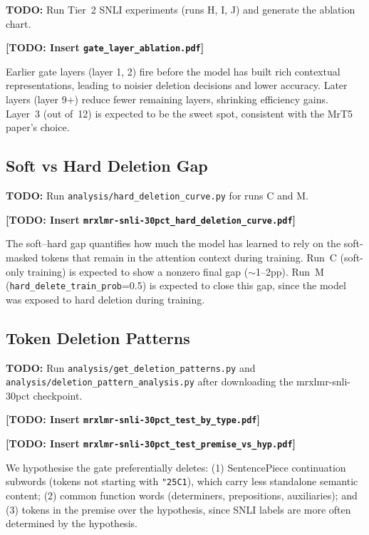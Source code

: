 \documentclass[11pt,a4paper]{article}
\newcommand{\todo}[1]{\begin{mdframed}[style=todostyle]\textcolor{todocolor}{\textbf{TODO:}} #1\end{mdframed}}
\begin{document}
\todo{Run Tier~2 SNLI experiments (runs H, I, J) and generate the ablation chart.}

\textbf{[TODO: Insert \texttt{gate\_layer\_ablation.pdf}]}

Earlier gate layers (layer 1, 2) fire before the model has built rich contextual representations, leading to noisier deletion decisions and lower accuracy. Later layers (layer 9+) reduce fewer remaining layers, shrinking efficiency gains. Layer~3 (out of~12) is expected to be the sweet spot, consistent with the MrT5 paper's choice.


\subsection{Soft vs Hard Deletion Gap}
\label{sec:soft-hard-gap}

\todo{Run \texttt{analysis/hard\_deletion\_curve.py} for runs C and M.}

\textbf{[TODO: Insert \texttt{mrxlmr-snli-30pct\_hard\_deletion\_curve.pdf}]}

The soft--hard gap quantifies how much the model has learned to rely on the soft-masked tokens that remain in the attention context during training. Run~C (soft-only training) is expected to show a nonzero final gap ($\sim$1--2pp). Run~M (\texttt{hard\_delete\_train\_prob}=0.5) is expected to close this gap, since the model was exposed to hard deletion during training.


\subsection{Token Deletion Patterns}
\label{sec:deletion-patterns}

\todo{Run \texttt{analysis/get\_deletion\_patterns.py} and \texttt{analysis/deletion\_pattern\_analysis.py} after downloading the mrxlmr-snli-30pct checkpoint.}

\textbf{[TODO: Insert \texttt{mrxlmr-snli-30pct\_test\_by\_type.pdf}]}

\textbf{[TODO: Insert \texttt{mrxlmr-snli-30pct\_test\_premise\_vs\_hyp.pdf}]}

We hypothesise the gate preferentially deletes: (1) SentencePiece continuation subwords (tokens not starting with \texttt{\char"25C1}), which carry less standalone semantic content; (2) common function words (determiners, prepositions, auxiliaries); and (3) tokens in the premise over the hypothesis, since SNLI labels are more often determined by the hypothesis.
\end{document}
